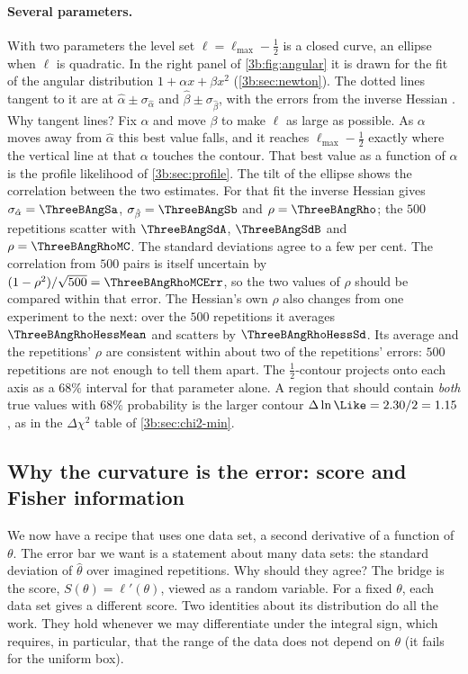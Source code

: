 \paragraph{Several parameters.}
With two parameters the level set $\ell=\ell_{\max}-\tfrac12$ is a closed
curve, an ellipse when $\ell$ is quadratic. In the right panel of
\cref{3b:fig:angular} it is drawn for the fit of the angular distribution
$1+\alpha x+\beta x^2$ (\cref{3b:sec:newton}). The dotted lines tangent to it
are at $\hat\alpha\pm\sigma_{\hat\alpha}$ and $\hat\beta\pm\sigma_{\hat\beta}$,
with the errors from the inverse Hessian . Why tangent
lines? Fix $\alpha$ and move $\beta$ to make $\ell$ as large as possible. As
$\alpha$ moves away from $\hat\alpha$ this best value falls, and it reaches
$\ell_{\max}-\tfrac12$ exactly where the vertical line at that $\alpha$
touches the contour. That best value as a function of $\alpha$ is the profile
likelihood of \cref{3b:sec:profile}. The tilt of the ellipse shows the
correlation between the two estimates. For that fit the inverse Hessian gives
$\sigma_{\hat\alpha}=\ThreeBAngSa$, $\sigma_{\hat\beta}=\ThreeBAngSb$ and
$\rho=\ThreeBAngRho$; the $500$ repetitions scatter with
$\ThreeBAngSdA$, $\ThreeBAngSdB$ and $\rho=\ThreeBAngRhoMC$. The standard
deviations agree to a few per cent. The correlation from $500$ pairs is
itself uncertain by $(1-\rho^2)/\sqrt{500}=\ThreeBAngRhoMCErr$, so the two
values of $\rho$ should be compared within that error. The Hessian's own
$\rho$ also changes from one experiment to the next: over the $500$
repetitions it averages $\ThreeBAngRhoHessMean$ and scatters by
$\ThreeBAngRhoHessSd$. Its average and the repetitions' $\rho$ are consistent
within about two of the repetitions' errors: $500$ repetitions are not enough
to tell them apart. The $\tfrac12$-contour projects onto each
axis as a $68\%$ interval for that parameter alone. A region that should
contain \emph{both} true values with $68\%$ probability is the larger
contour $\Delta\ln\Like=2.30/2=1.15$, as in the $\Delta\chi^2$ table of
\cref{3b:sec:chi2-min}.

\subsection{Why the curvature is the error: score and Fisher information}
\label{3b:sec:fisher-info}

We now have a recipe that uses one data set, a second derivative of a
function of $\theta$. The error bar we want is a statement about many data
sets: the standard deviation of $\hat\theta$ over imagined repetitions. Why
should they agree? The bridge is the score, $S(\theta)=\ell'(\theta)$,
viewed as a random variable. For a fixed $\theta$, each data set gives a
different score. Two identities about its distribution do all the work.
They hold whenever we may differentiate under the integral sign, which
requires, in particular, that the range of the data does not depend on
$\theta$ (it fails for the uniform box).

